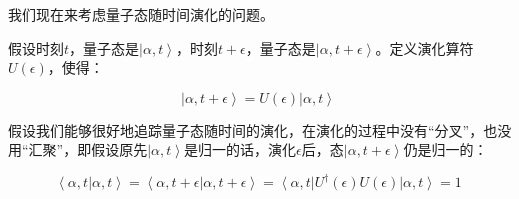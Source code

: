 我们现在来考虑量子态随时间演化的问题。

假设时刻$t$，量子态是$\left| \alpha, t \right\rangle$，时刻$t + \epsilon$，量子态是$\left| \alpha, t+\epsilon \right\rangle$。定义演化算符$U(\epsilon)$，使得：

\begin{equation}
\left| \alpha, t + \epsilon \right\rangle = U(\epsilon ) \left| \alpha, t \right\rangle~
\end{equation}

假设我们能够很好地追踪量子态随时间的演化，在演化的过程中没有“分叉”，也没用“汇聚”，即假设原先$\left| \alpha, t \right\rangle$是归一的话，演化$\epsilon$后，态$\left| \alpha, t + \epsilon \right\rangle$仍是归一的：

\begin{equation}
\left\langle \alpha, t | \alpha, t \right\rangle =  \left\langle \alpha, t + \epsilon | \alpha, t + \epsilon \right\rangle = \left\langle \alpha, t \right| U^\dagger (\epsilon ) U(\epsilon) \left| \alpha, t \right\rangle = 1~
\end{equation}

